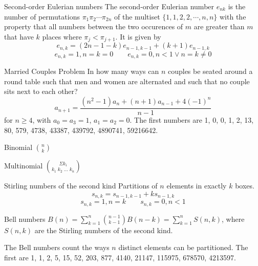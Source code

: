 \begin{algorithm}{Second-order Eulerian numbers}
\desc
The second-order Eulerian number $e_{nk}$ is the number of
permutations $\pi_1 \pi_2 \cdots \pi_{2n}$ of the multiset
$\{1,1,2,2,\cdots,n,n\}$ with the property that all numbers between
the two occurences of $m$ are greater than $m$ that have $k$ places
where $\pi_j < \pi_{j+1}$. It is given by
$$e_{n,k} = (2n-1-k)e_{n-1,k-1} + (k+1) e_{n-1, k}$$
$$e_{n,k} = 1, n = k = 0 \qquad e_{n,k} = 0, n < 1 \vee n = k \ne 0$$
\end{algorithm}


\begin{algorithm}{Married Couples Problem}
\desc
In how many ways can $n$ couples be seated around a round table such
that men and women are alternated and such that no couple sits next to
each other?
$$a_{n+1} = \frac{(n^2-1)a_n + (n+1)a_{n-1} + 4(-1)^n}{n-1}$$ for $n
\ge 4$, with $a_0 = a_3 = 1$, $a_1 = a_2 = 0$.  The first numbers are
1, 0, 0, 1, 2, 13, 80, 579, 4738, 43387, 439792, 4890741, 59216642.
\end{algorithm}




\begin{algorithm}{Binomial $\binom{n}{k}$}
\end{algorithm}

\begin{algorithm}{Multinomial $\binom{\Sigma k_i}{k_1\;k_2\;\ldots\;k_n}$}
\end{algorithm}


\begin{algorithm}{Stirling numbers of the second kind}
\desc
Partitions of $n$ elements in exactly $k$ boxes.
$$s_{n,k} = s_{n-1,k-1} + ks_{n-1,k}$$
$$s_{n,k} = 1, n = k \qquad s_{n,k} = 0, n < 1$$
\end{algorithm}

\begin{algorithm}{Bell numbers}
\desc
$B(n) = \sum_{k=1}^n \binom{n-1}{k-1} B(n-k) = \sum_{k=1}^n S(n,k)$,
where $S(n, k)$ are the Stirling numbers of the second kind.

The Bell numbers count the ways $n$ distinct elements can be
partitioned.  The first are 1, 1, 2, 5, 15, 52, 203, 877, 4140, 21147,
115975, 678570, 4213597.
\end{algorithm}


